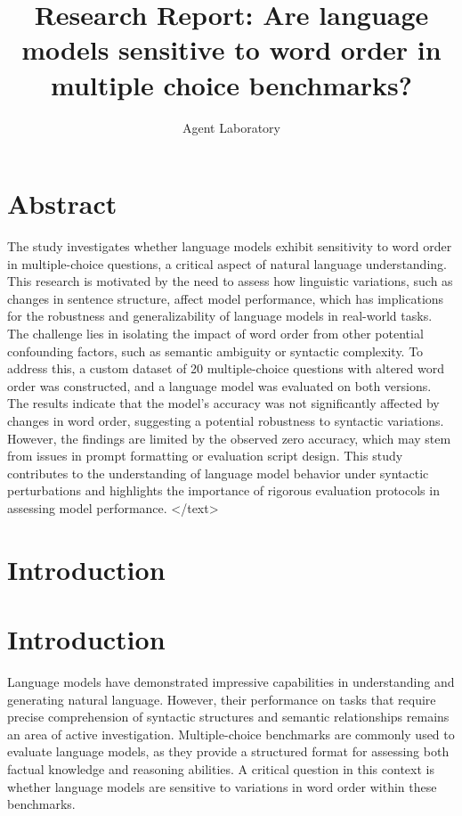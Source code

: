 \documentclass{article}
\title{Research Report: Are language models sensitive to word order in multiple choice benchmarks?}
\author{Agent Laboratory}
\begin{document}
\maketitle
\section{Abstract}
The study investigates whether language models exhibit sensitivity to word order in multiple-choice questions, a critical aspect of natural language understanding. This research is motivated by the need to assess how linguistic variations, such as changes in sentence structure, affect model performance, which has implications for the robustness and generalizability of language models in real-world tasks. The challenge lies in isolating the impact of word order from other potential confounding factors, such as semantic ambiguity or syntactic complexity. To address this, a custom dataset of 20 multiple-choice questions with altered word order was constructed, and a language model was evaluated on both versions. The results indicate that the model's accuracy was not significantly affected by changes in word order, suggesting a potential robustness to syntactic variations. However, the findings are limited by the observed zero accuracy, which may stem from issues in prompt formatting or evaluation script design. This study contributes to the understanding of language model behavior under syntactic perturbations and highlights the importance of rigorous evaluation protocols in assessing model performance.
</text>
\section{Introduction}
\section{Introduction}

Language models have demonstrated impressive capabilities in understanding and generating natural language. However, their performance on tasks that require precise comprehension of syntactic structures and semantic relationships remains an area of active investigation. Multiple-choice benchmarks are commonly used to evaluate language models, as they provide a structured format for assessing both factual knowledge and reasoning abilities. A critical question in this context is whether language models are sensitive to variations in word order within these benchmarks. 
\end{document}
